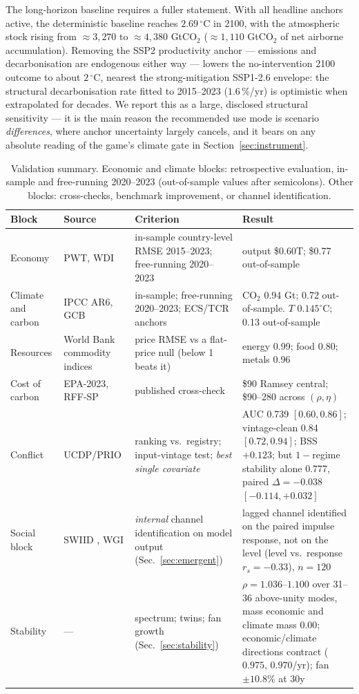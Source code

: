\documentclass[a4paper,fleqn]{cas-sc}
\begin{document}
The long-horizon baseline requires a fuller statement. With all headline
anchors active, the deterministic baseline reaches $2.69\,^{\circ}$C in 2100, with the
atmospheric stock rising from ${\approx}3{,}270$ to ${\approx}4{,}380$ GtCO$_2$
(${\approx}1{,}110$ GtCO$_2$ of net airborne accumulation). Removing the SSP2 productivity
anchor --- emissions and decarbonisation are endogenous either way --- lowers the
no-intervention 2100 outcome to about $2\,^{\circ}$C, nearest the strong-mitigation SSP1-2.6
envelope: the structural decarbonisation rate fitted to 2015--2023 ($1.6\,\%$/yr) is optimistic
when extrapolated for decades. We report this as a large, disclosed structural sensitivity ---
it is the main reason the recommended use mode is scenario \emph{differences}, where anchor
uncertainty largely cancels, and it bears on any absolute reading of the game's climate gate in
Section~\ref{sec:instrument}.

\begin{table}[t]
\centering
\caption{Validation summary. Economic and climate blocks: retrospective evaluation, in-sample
and free-running 2020--2023 (out-of-sample values after semicolons). Other blocks: cross-checks,
benchmark improvement, or channel identification.}
\label{tab:backtest}
\small
\begin{tabularx}{\linewidth}{@{}l l L L@{}}
\toprule
Block & Source & Criterion & Result \\
\midrule
Economy & PWT, WDI & in-sample country-level RMSE 2015--2023; free-running 2020--2023 & output \$0.60T; \$0.77 out-of-sample \\
Climate and carbon & IPCC AR6, GCB & in-sample; free-running 2020--2023; ECS/TCR anchors & CO$_2$ 0.94 Gt; 0.72 out-of-sample. $T$ $0.145^{\circ}$C; 0.13 out-of-sample \\
Resources & World Bank commodity indices & price RMSE vs a flat-price null (below 1 beats it) & energy 0.99; food 0.80; metals 0.96 \\
Cost of carbon & EPA-2023, RFF-SP & published cross-check & \$90 Ramsey central; \$90--280 across $(\rho,\eta)$ \\
Conflict & UCDP/PRIO & ranking vs.\ registry; input-vintage test; \emph{best single covariate} & AUC 0.739 $[0.60,0.86]$; vintage-clean 0.84 $[0.72,0.94]$; BSS $+0.123$; but $1-$regime stability alone 0.777, paired $\Delta{=}{-}0.038$ $[-0.114,+0.032]$ \\
Social block & SWIID \citep{solt2020}, WGI \citep{kaufmann2011} & \emph{internal} channel identification on model output (Sec.~\ref{sec:emergent}) & lagged channel identified on the paired impulse response, not on the level (level vs.\ response $r_s{=}{-}0.33$), $n{=}120$ \\
Stability & --- & spectrum; twins; fan growth (Sec.~\ref{sec:stability}) & $\rho{=}1.036$--$1.100$ over 31--36 above-unity modes, mass economic and climate mass $0.00$; economic/climate directions contract ($0.975$, $0.970$/yr); fan ${\pm}10.8\%$ at 30y \\
\bottomrule
\end{tabularx}
\end{table}
\end{document}
